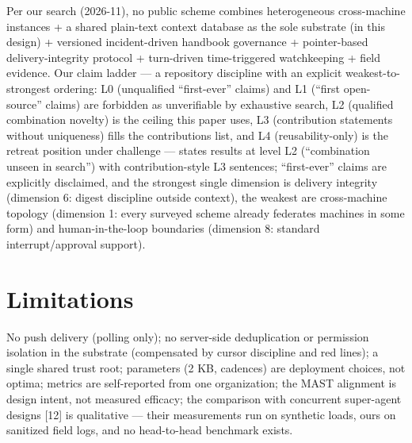 \documentclass[journal]{IEEEtran}
\begin{document}
Per our search (2026-11), no public scheme combines heterogeneous
cross-machine instances + a shared plain-text context database as the
sole substrate (in this design) + versioned incident-driven handbook
governance + pointer-based delivery-integrity protocol + turn-driven
time-triggered watchkeeping + field evidence. Our claim ladder --- a
repository discipline with an explicit weakest-to-strongest ordering: L0
(unqualified ``first-ever'' claims) and L1 (``first open-source''
claims) are forbidden as unverifiable by exhaustive search, L2
(qualified combination novelty) is the ceiling this paper uses, L3
(contribution statements without uniqueness) fills the contributions
list, and L4 (reusability-only) is the retreat position under challenge
--- states results at level L2 (``combination unseen in search'') with
contribution-style L3 sentences; ``first-ever'' claims are explicitly
disclaimed, and the strongest single dimension is delivery integrity
(dimension 6: digest discipline outside context), the weakest are
cross-machine topology (dimension 1: every surveyed scheme already
federates machines in some form) and human-in-the-loop boundaries
(dimension 8: standard interrupt/approval support).



\section{Limitations}


No push delivery (polling only); no server-side deduplication or
permission isolation in the substrate (compensated by cursor discipline
and red lines); a single shared trust root; parameters (2 KB, cadences)
are deployment choices, not optima; metrics are self-reported from one
organization; the MAST alignment is design intent, not measured
efficacy; the comparison with concurrent super-agent designs {[}12{]} is
qualitative --- their measurements run on synthetic loads, ours on
sanitized field logs, and no head-to-head benchmark exists.
\end{document}
